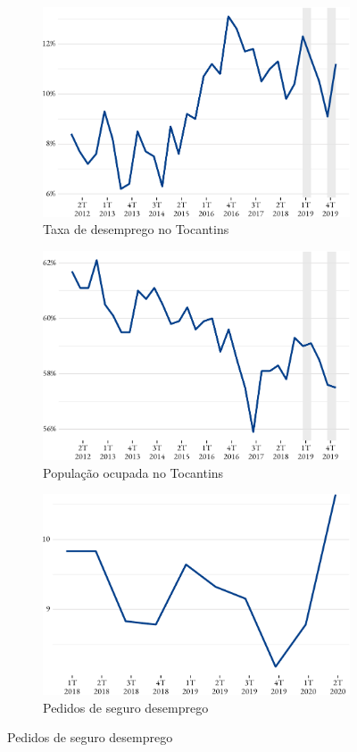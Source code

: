 \begin{figure}[!h]
\begin{subfigure}{\linewidth}
	\caption{Taxa de desemprego no Tocantins}
	\includegraphics{fig/tx_desemprego_to-1.pdf}
\end{subfigure}
\begin{subfigure}{\linewidth}
	\caption{População ocupada no Tocantins}
	\includegraphics{fig/pop_ocupada-1.pdf}
\end{subfigure}
\begin{subfigure}{\linewidth}
	\caption{Pedidos de seguro desemprego}
	\includegraphics{fig/pedido_segudo_desem-1.pdf}
\end{subfigure}
\end{figure}

